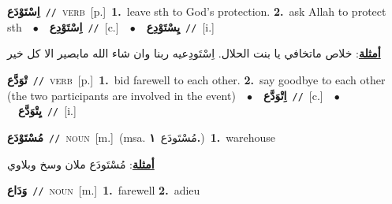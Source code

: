 \documentclass[10pt,a4paper,twoside]{article} %
\begin{document}
\begin{multicols}{2}
{\setlength\topsep{0pt}\textbf{\foreignlanguage{arabic}{اِسْتَوْدَع}}\ {\color{gray}\texttt{//}\color{black}}\ \textsc{verb}\ [p.]\ \textbf{1.}~leave sth to God's protection.  \textbf{2.}~ask Allah to protect sth\ \ $\bullet$\ \ \setlength\topsep{0pt}\textbf{\foreignlanguage{arabic}{اِسْتَوْدِع}}\ {\color{gray}\texttt{//}\color{black}}\ [c.]\ \ $\bullet$\ \ \setlength\topsep{0pt}\textbf{\foreignlanguage{arabic}{يِسْتَوْدِع}}\ {\color{gray}\texttt{//}\color{black}}\ [i.]\  \begin{flushright}\color{gray}\foreignlanguage{arabic}{\textbf{\underline{\foreignlanguage{arabic}{أمثلة}}}: خلاص ماتخافي يا بنت الحلال. اِسْتَودِعيه ربنا وان شاء الله مابصير الا كل خير}\end{flushright}\color{black}} \vspace{2mm}

{\setlength\topsep{0pt}\textbf{\foreignlanguage{arabic}{تْوَدَّع}}\ {\color{gray}\texttt{//}\color{black}}\ \textsc{verb}\ [p.]\ \textbf{1.}~bid farewell to each other.  \textbf{2.}~say goodbye to each other (the two participants are involved in the event)\ \ $\bullet$\ \ \setlength\topsep{0pt}\textbf{\foreignlanguage{arabic}{اِتْوَدَّع}}\ {\color{gray}\texttt{//}\color{black}}\ [c.]\ \ $\bullet$\ \ \setlength\topsep{0pt}\textbf{\foreignlanguage{arabic}{يِتْوَدَّع}}\ {\color{gray}\texttt{//}\color{black}}\ [i.]\ } \vspace{2mm}

{\setlength\topsep{0pt}\textbf{\foreignlanguage{arabic}{مُسْتَوْدَع}}\ {\color{gray}\texttt{//}\color{black}}\ \textsc{noun}\ [m.]\ \color{gray}(msa. \foreignlanguage{arabic}{مُسْتَودَع}~\foreignlanguage{arabic}{\textbf{١.}})\color{black}\ \textbf{1.}~warehouse\  \begin{flushright}\color{gray}\foreignlanguage{arabic}{\textbf{\underline{\foreignlanguage{arabic}{أمثلة}}}: مُسْتَودَع ملان وسخ وبلاوي}\end{flushright}\color{black}} \vspace{2mm}

{\setlength\topsep{0pt}\textbf{\foreignlanguage{arabic}{وَدَاع}}\ {\color{gray}\texttt{//}\color{black}}\ \textsc{noun}\ [m.]\ \textbf{1.}~farewell  \textbf{2.}~adieu\ } \vspace{2mm}


\end{multicols}
\end{document}
